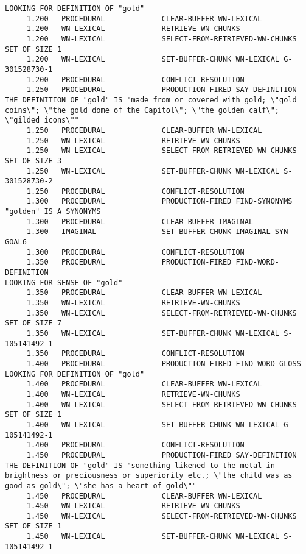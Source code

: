 \begin{verbatim}
LOOKING FOR DEFINITION OF "gold" 
     1.200   PROCEDURAL             CLEAR-BUFFER WN-LEXICAL 
     1.200   WN-LEXICAL             RETRIEVE-WN-CHUNKS 
     1.200   WN-LEXICAL             SELECT-FROM-RETRIEVED-WN-CHUNKS SET OF SIZE 1 
     1.200   WN-LEXICAL             SET-BUFFER-CHUNK WN-LEXICAL G-301528730-1 
     1.200   PROCEDURAL             CONFLICT-RESOLUTION 
     1.250   PROCEDURAL             PRODUCTION-FIRED SAY-DEFINITION 
THE DEFINITION OF "gold" IS "made from or covered with gold; \"gold coins\"; \"the gold dome of the Capitol\"; \"the golden calf\"; \"gilded icons\"" 
     1.250   PROCEDURAL             CLEAR-BUFFER WN-LEXICAL 
     1.250   WN-LEXICAL             RETRIEVE-WN-CHUNKS 
     1.250   WN-LEXICAL             SELECT-FROM-RETRIEVED-WN-CHUNKS SET OF SIZE 3 
     1.250   WN-LEXICAL             SET-BUFFER-CHUNK WN-LEXICAL S-301528730-2 
     1.250   PROCEDURAL             CONFLICT-RESOLUTION 
     1.300   PROCEDURAL             PRODUCTION-FIRED FIND-SYNONYMS 
"golden" IS A SYNONYMS 
     1.300   PROCEDURAL             CLEAR-BUFFER IMAGINAL 
     1.300   IMAGINAL               SET-BUFFER-CHUNK IMAGINAL SYN-GOAL6 
     1.300   PROCEDURAL             CONFLICT-RESOLUTION 
     1.350   PROCEDURAL             PRODUCTION-FIRED FIND-WORD-DEFINITION 
LOOKING FOR SENSE OF "gold" 
     1.350   PROCEDURAL             CLEAR-BUFFER WN-LEXICAL 
     1.350   WN-LEXICAL             RETRIEVE-WN-CHUNKS 
     1.350   WN-LEXICAL             SELECT-FROM-RETRIEVED-WN-CHUNKS SET OF SIZE 7 
     1.350   WN-LEXICAL             SET-BUFFER-CHUNK WN-LEXICAL S-105141492-1 
     1.350   PROCEDURAL             CONFLICT-RESOLUTION 
     1.400   PROCEDURAL             PRODUCTION-FIRED FIND-WORD-GLOSS 
LOOKING FOR DEFINITION OF "gold" 
     1.400   PROCEDURAL             CLEAR-BUFFER WN-LEXICAL 
     1.400   WN-LEXICAL             RETRIEVE-WN-CHUNKS 
     1.400   WN-LEXICAL             SELECT-FROM-RETRIEVED-WN-CHUNKS SET OF SIZE 1 
     1.400   WN-LEXICAL             SET-BUFFER-CHUNK WN-LEXICAL G-105141492-1 
     1.400   PROCEDURAL             CONFLICT-RESOLUTION 
     1.450   PROCEDURAL             PRODUCTION-FIRED SAY-DEFINITION 
THE DEFINITION OF "gold" IS "something likened to the metal in brightness or preciousness or superiority etc.; \"the child was as good as gold\"; \"she has a heart of gold\"" 
     1.450   PROCEDURAL             CLEAR-BUFFER WN-LEXICAL 
     1.450   WN-LEXICAL             RETRIEVE-WN-CHUNKS 
     1.450   WN-LEXICAL             SELECT-FROM-RETRIEVED-WN-CHUNKS SET OF SIZE 1 
     1.450   WN-LEXICAL             SET-BUFFER-CHUNK WN-LEXICAL S-105141492-1 

\end{verbatim}
